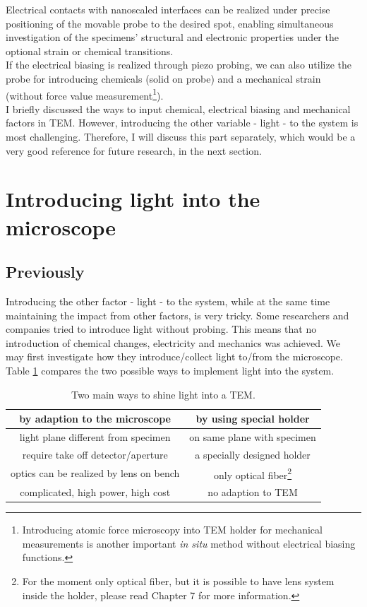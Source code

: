 Electrical contacts with nanoscaled interfaces can be realized under precise positioning of the movable probe to the desired spot, enabling simultaneous investigation of the specimens' structural and electronic properties under the optional strain or chemical transitions.\\

If the electrical biasing is realized through piezo probing, we can also utilize the probe for introducing chemicals (solid on probe) and a mechanical strain (without force value measurement\footnote{Introducing atomic force microscopy into TEM holder for mechanical measurements is another important {\em in situ} method without electrical biasing functions.}). \\

I briefly discussed the ways to input chemical, electrical biasing and mechanical factors in TEM. However, introducing  the other variable - light - to the system is most challenging. Therefore, I will discuss this part separately, which would be a very good reference for future research, in the next section. 

\section{Introducing light into the microscope}
\subsection{Previously}
Introducing the other factor - light - to the system, while at the same time maintaining the impact from other factors, is very tricky. Some researchers and companies tried to introduce light without probing. This means that no introduction of chemical changes, electricity and mechanics was achieved. We may first investigate how they introduce/collect light to/from the microscope. 
Table \ref{table2.1} compares the two possible ways to implement light into the system. 

\begin{table}[ht]
\centering 
\begin{tabular}{|c|c|} 
\hline 
by adaption to the microscope & by using special holder \\ [0.5ex] 
\hline 
light plane different from specimen & on same plane with specimen \\[1.5ex] 
require take off detector/aperture & a specially designed holder \\[1.5ex]
optics can be realized by lens on bench & only optical fiber\footnote{For the moment only optical fiber, but it is possible to have lens system inside the holder, please read Chapter 7 for more information.} \\[1.5ex]
complicated, high power, high cost & no adaption to TEM\\[1.5ex]
\hline
\end{tabular}
\caption{Two main ways to shine light into a TEM.} 
\label{table2.1} 
\end{table}

